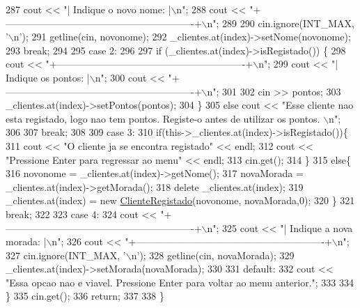 \begin{DoxyCode}
287         cout << \textcolor{stringliteral}{"| Indique o novo nome:                                     |\(\backslash\)n"};
288         cout << \textcolor{stringliteral}{"+----------------------------------------------------------+\(\backslash\)n"};
289 
290         cin.ignore(INT\_MAX, \textcolor{charliteral}{'\(\backslash\)n'});
291         getline(cin, novonome);
292         \_clientes.at(index)->setNome(novonome);
293         \textcolor{keywordflow}{break};
294 
295     \textcolor{keywordflow}{case} 2:
296 
297         \textcolor{keywordflow}{if} (\_clientes.at(index)->isRegistado()) \{
298             cout << \textcolor{stringliteral}{"+----------------------------------------------------------+\(\backslash\)n"};
299             cout << \textcolor{stringliteral}{"| Indique os pontos:                                       |\(\backslash\)n"};
300             cout << \textcolor{stringliteral}{"+----------------------------------------------------------+\(\backslash\)n"};
301 
302             cin >> pontos;
303             \_clientes.at(index)->setPontos(pontos);
304         \}
305         \textcolor{keywordflow}{else} cout << \textcolor{stringliteral}{"Esse cliente nao esta registado, logo nao tem pontos. Registe-o antes de utilizar os
       pontos. \(\backslash\)n"};
306 
307         \textcolor{keywordflow}{break};
308 
309     \textcolor{keywordflow}{case} 3:
310         \textcolor{keywordflow}{if}(this->\_clientes.at(index)->isRegistado())\{
311             cout << \textcolor{stringliteral}{"O cliente ja se encontra registado"} << endl;
312             cout << \textcolor{stringliteral}{"Pressione Enter para regressar ao menu"} << endl;
313             cin.get();
314         \}
315         \textcolor{keywordflow}{else}\{
316         novonome = \_clientes.at(index)->getNome();
317         novaMorada = \_clientes.at(index)->getMorada();
318         \textcolor{keyword}{delete} \_clientes.at(index);
319         \_clientes.at(index) = \textcolor{keyword}{new} \hyperlink{classClienteRegistado}{ClienteRegistado}(novonome, novaMorada,0);
320         \}
321         \textcolor{keywordflow}{break};
322 
323     \textcolor{keywordflow}{case} 4:
324         cout << \textcolor{stringliteral}{"+----------------------------------------------------------+\(\backslash\)n"};
325         cout << \textcolor{stringliteral}{"| Indique a nova morada:                                   |\(\backslash\)n"};
326         cout << \textcolor{stringliteral}{"+----------------------------------------------------------+\(\backslash\)n"};
327         cin.ignore(INT\_MAX, \textcolor{charliteral}{'\(\backslash\)n'});
328         getline(cin, novaMorada);
329         \_clientes.at(index)->setMorada(novaMorada);
330     
331     \textcolor{keywordflow}{default}:
332         cout << \textcolor{stringliteral}{"Essa opcao nao e viavel. Pressione Enter para voltar ao menu anterior."};
333 
334     \}
335     cin.get();
336     \textcolor{keywordflow}{return};
337 
338 \}
\end{DoxyCode}


